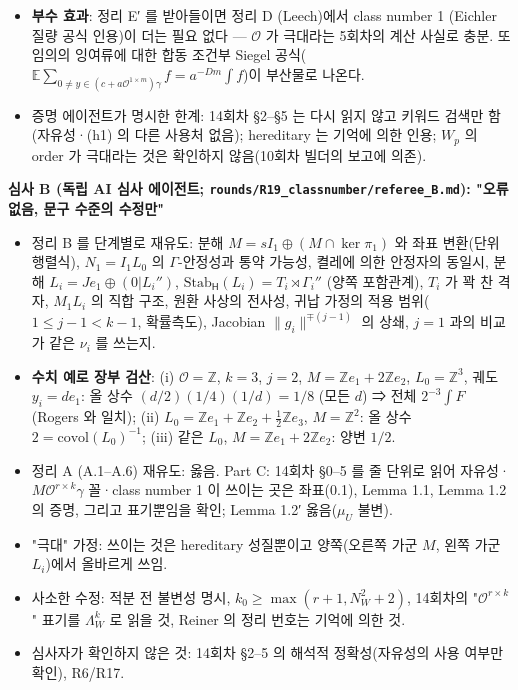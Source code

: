 \begin{itemize}
\item
  \textbf{부수 효과}: 정리 E′ 를 받아들이면 정리 D (Leech)에서 class number 1 (Eichler 질량 공식 인용)이 더는 필요 없다 --- \(\mathcal O\) 가 극대라는 5회차의 계산 사실로 충분. 또 임의의 잉여류에 대한 합동 조건부 Siegel 공식(\(\mathbb E\sum_{0\ne y\in(c+a\mathcal O^{1\times m})\gamma}f=a^{-Dm}\int f\))이 부산물로 나온다.
\item
  증명 에이전트가 명시한 한계: 14회차 §2--§5 는 다시 읽지 않고 키워드 검색만 함(자유성·(h1) 의 다른 사용처 없음); hereditary 는 기억에 의한 인용; \(W_p\) 의 order 가 극대라는 것은 확인하지 않음(10회차 빌더의 보고에 의존).
\end{itemize}

\textbf{심사 B (독립 AI 심사 에이전트; \texttt{rounds/R19\_classnumber/referee\_B.md}): "오류 없음, 문구 수준의 수정만"}

\begin{itemize}
\tightlist
\item
  정리 B 를 단계별로 재유도: 분해 \(M=sI_1\oplus(M\cap\ker\pi_1)\) 와 좌표 변환(단위행렬식), \(N_1=I_1L_0\) 의 \(\Gamma\)-안정성과 통약 가능성, 켤레에 의한 안정자의 동일시, 분해 \(L_i=Je_1\oplus(0|L_i'')\), \(\mathrm{Stab}_{\mathsf H}(L_i)=T_i\rtimes\Gamma_i''\) (양쪽 포함관계), \(T_i\) 가 꽉 찬 격자, \(M_1L_i\) 의 직합 구조, 원환 사상의 전사성, 귀납 가정의 적용 범위(\(1\le j-1<k-1\), 확률측도), Jacobian \(\|g_i\|^{\mp(j-1)}\) 의 상쇄, \(j=1\) 과의 비교가 같은 \(\nu_i\) 를 쓰는지.
\item
  \textbf{수치 예로 장부 검산}: (i) \(\mathcal O=\mathbb Z\), \(k=3\), \(j=2\), \(M=\mathbb Ze_1+2\mathbb Ze_2\), \(L_0=\mathbb Z^3\), 궤도 \(y_i=de_1\): 올 상수 \((d/2)(1/4)(1/d)=1/8\) (모든 \(d\)) ⇒ 전체 \(2^{-3}\int F\) (Rogers 와 일치); (ii) \(L_0=\mathbb Ze_1+\mathbb Ze_2+\frac12\mathbb Ze_3\), \(M=\mathbb Z^2\): 올 상수 \(2=\mathrm{covol}(L_0)^{-1}\); (iii) 같은 \(L_0\), \(M=\mathbb Ze_1+2\mathbb Ze_2\): 양변 \(1/2\).
\item
  정리 A (A.1--A.6) 재유도: 옳음. Part C: 14회차 §0--5 를 줄 단위로 읽어 자유성·\(M\mathcal O^{r\times k}\gamma\) 꼴·class number 1 이 쓰이는 곳은 좌표(0.1), Lemma 1.1, Lemma 1.2 의 증명, 그리고 표기뿐임을 확인; Lemma 1.2′ 옳음(\(\mu_U\) 불변).
\item
  "극대" 가정: 쓰이는 것은 hereditary 성질뿐이고 양쪽(오른쪽 가군 \(M\), 왼쪽 가군 \(L_i\))에서 올바르게 쓰임.
\item
  사소한 수정: 적분 전 불변성 명시, \(k_0\ge\max(r+1,N_W^2+2)\), 14회차의 "\(\mathcal O^{r\times k}\)" 표기를 \(\Lambda_W^k\) 로 읽을 것, Reiner 의 정리 번호는 기억에 의한 것.
\item
  심사자가 확인하지 않은 것: 14회차 §2--5 의 해석적 정확성(자유성의 사용 여부만 확인), R6/R17.
\end{itemize}

